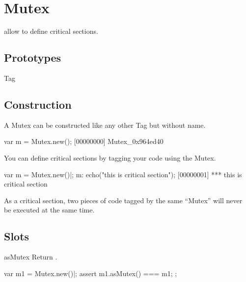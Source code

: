 
\section{Mutex}

 allow to define critical sections.

\subsection{Prototypes}
\begin{refObjects}
\item[Tag]
\end{refObjects}

\subsection{Construction}
A Mutex can be constructed like any other Tag but without name.

\begin{urbiscript}[firstnumber=1]
var m = Mutex.new();
[00000000] Mutex_0x964ed40
\end{urbiscript}

You can define critical sections by tagging your code using the Mutex.

\begin{urbiscript}[firstnumber=1]
var m = Mutex.new()|;
m: echo("this is critical section");
[00000001] *** this is critical section
\end{urbiscript}

As a critical section, two pieces of code tagged by the same ``Mutex''
will never be executed at the same time.

\subsection{Slots}

\begin{urbiscriptapi}
\item[asMutex]  Return \this.
\begin{urbiscript}
var m1 = Mutex.new()|;
assert
{
  m1.asMutex() === m1;
};
\end{urbiscript}
\end{urbiscriptapi}


